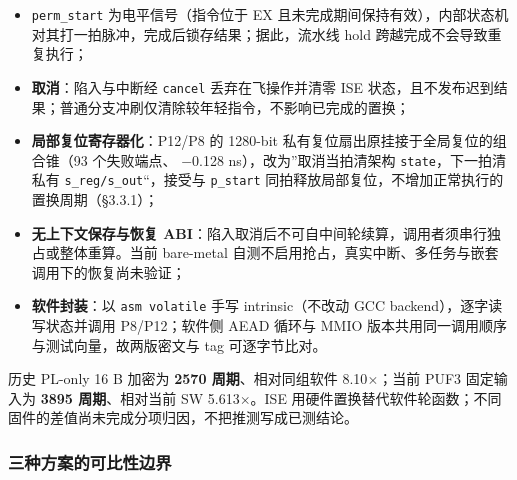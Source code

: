 \begin{itemize}
\tightlist
\item
  \texttt{perm\_\allowbreak{}start} 为电平信号（指令位于 EX 且未完成期间保持有效），内部状态机对其打一拍脉冲，完成后锁存结果；据此，流水线 hold 跨越完成不会导致重复执行；
\item
  \textbf{取消}：陷入与中断经 \texttt{cancel} 丢弃在飞操作并清零 ISE 状态，且不发布迟到结果；普通分支冲刷仅清除较年轻指令，不影响已完成的置换；
\item
  \textbf{局部复位寄存器化}：P12/P8 的 1280-bit 私有复位扇出原挂接于全局复位的组合锥（93 个失败端点、 $-$0.128 ns），改为''取消当拍清架构 \texttt{state}，下一拍清私有 \texttt{s\_\allowbreak{}reg/\allowbreak{}s\_\allowbreak{}out}``，接受与 \texttt{p\_\allowbreak{}start} 同拍释放局部复位，不增加正常执行的置换周期（§3.3.1）；
\item
  \textbf{无上下文保存与恢复 ABI}：陷入取消后不可自中间轮续算，调用者须串行独占或整体重算。当前 bare-metal 自测不启用抢占，真实中断、多任务与嵌套调用下的恢复尚未验证；
\item
  \textbf{软件封装}：以 \texttt{asm\ volatile} 手写 intrinsic（不改动 GCC backend），逐字读写状态并调用 P8/P12；软件侧 AEAD 循环与 MMIO 版本共用同一调用顺序与测试向量，故两版密文与 tag 可逐字节比对。
\end{itemize}

历史 PL-only 16 B 加密为 \textbf{2570 周期}、相对同组软件 8.10$\times$；当前 PUF3 固定输入为 \textbf{3895 周期}、相对当前 SW 5.613$\times$。ISE 用硬件置换替代软件轮函数；不同固件的差值尚未完成分项归因，不把推测写成已测结论。


\Needspace{150pt}

\subsubsection{三种方案的可比性边界}

